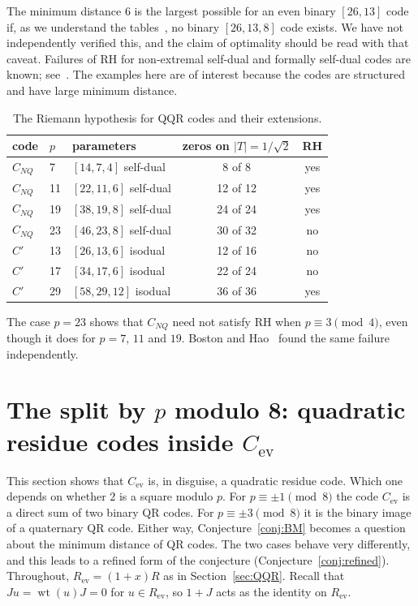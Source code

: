 \documentclass[12pt,letterpaper]{article}
\theoremstyle{definition}
\theoremstyle{remark}
\numberwithin{equation}{section}
\newcommand{\wt}{\operatorname{wt}}
\newcommand{\CNQ}{C_{NQ}}
\newcommand{\Cev}{C_{\mathrm{ev}}}
\begin{document}
The minimum distance $6$ is the largest possible for an even binary $[26,13]$ code
if, as we understand the tables~\cite{Gr26}, no binary $[26,13,8]$ code exists. We
have not independently verified this, and the claim of optimality should be read
with that caveat. Failures of RH for non-extremal self-dual and formally self-dual
codes are known; see~\cite{Du03,Ch05,Ch17}. The examples here are of interest
because the codes are structured and have large minimum distance.

\begin{table}[ht]
\centering
\begin{tabular}{@{}lllcc@{}}
\toprule
code & $p$ & parameters & zeros on $|T|=1/\sqrt2$ & RH\\
\midrule
$\CNQ$ & 7 & $[14,7,4]$ self-dual & 8 of 8 & yes\\
$\CNQ$ & 11 & $[22,11,6]$ self-dual & 12 of 12 & yes\\
$\CNQ$ & 19 & $[38,19,8]$ self-dual & 24 of 24 & yes\\
$\CNQ$ & 23 & $[46,23,8]$ self-dual & 30 of 32 & no\\
$C'$ & 13 & $[26,13,6]$ isodual & 12 of 16 & no\\
$C'$ & 17 & $[34,17,6]$ isodual & 22 of 24 & no\\
$C'$ & 29 & $[58,29,12]$ isodual & 36 of 36 & yes\\
\bottomrule
\end{tabular}
\caption{The Riemann hypothesis for QQR codes and their extensions.}
\label{tab:RH}
\end{table}

The case $p=23$ shows that $\CNQ$ need not satisfy RH when $p\equiv3\pmod4$, even
though it does for $p=7$, $11$ and $19$. Boston and Hao~\cite{BH17} found the same
failure independently.

\section{\texorpdfstring{The split by $p$ modulo 8: quadratic residue codes inside $\Cev$}{The split by p modulo 8: quadratic residue codes inside C\_ev}}
\label{sec:mod8}

This section shows that $\Cev$ is, in disguise, a quadratic residue code. Which one
depends on whether $2$ is a square modulo $p$. For $p\equiv\pm1\pmod8$ the code
$\Cev$ is a direct sum of two binary QR codes. For $p\equiv\pm3\pmod8$ it is the
binary image of a quaternary QR code. Either way, Conjecture~\ref{conj:BM} becomes
a question about the minimum distance of QR codes. The two cases behave very
differently, and this leads to a refined form of the conjecture
(Conjecture~\ref{conj:refined}). Throughout, $R_{\mathrm{ev}}=(1+x)R$ as in
Section~\ref{sec:QQR}. Recall that $Ju=\wt(u)J=0$ for $u\in R_{\mathrm{ev}}$, so
$1+J$ acts as the identity on $R_{\mathrm{ev}}$.
\end{document}
